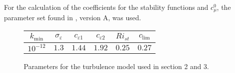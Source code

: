 For the calculation of the coefficients for the stability functions and 
$c_\mu^0$, the parameter set found in \cite{Canuto2001}, version A, was used.

\begin{figure}[ht]
\begin{tabular}{cccccc}
  $k_{\min}$ & $\sigma_\varepsilon$ & $c_{\varepsilon 1}$ & 
$c_{\varepsilon 2}$ & $Ri_{st}$ & $c_{\lim}$\\
\hline
$10^{-12}$ & $1.3$ & $1.44$ & $1.92$ & $0.25$ & $0.27$ \\
 \end{tabular}
\caption{Parameters for the turbulence model used in section 
2 and 3.}\label{tabellchen}
\end{figure}